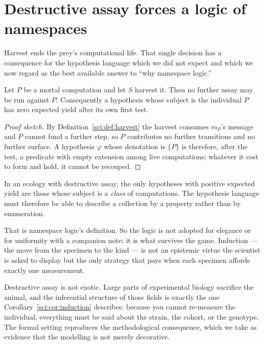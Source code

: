 \section{Destructive assay forces a logic of namespaces}\label{sci:S8}
\label{sci:sec:forced}

Harvest ends the prey's computational life. That single decision has a consequence for the hypothesis
language which we did not expect and which we now regard as the best available answer to ``why
namespace logic.''

\begin{proposition}
\label{sci:prop:onespecimen}
Let $P$ be a mortal computation and let $S$ harvest it. Then no further assay may be run against $P$.
Consequently a hypothesis whose subject is the individual $P$ has zero expected yield after its own
first test.
\end{proposition}

\begin{proof}[Proof sketch]
By Definition~\ref{sci:def:harvest} the harvest consumes $m_P$'s message and $P$ cannot fund a further
step, so $P$ contributes no further transitions and no further surface. A hypothesis $\varphi$ whose
denotation is $\{P\}$ is therefore, after the test, a predicate with empty extension among live
computations; whatever it cost to form and hold, it cannot be recouped.
\end{proof}

\begin{corollary}
\label{sci:cor:induction}
In an ecology with destructive assay, the only hypotheses with positive expected yield are those whose
subject is a \emph{class} of computations. The hypothesis language must therefore be able to describe
a collection by a property rather than by enumeration.
\end{corollary}

That is namespace logic's definition. So the logic is not adopted for elegance or for uniformity with
a companion note; it is what survives the game. Induction --- the move from the specimen to the kind
--- is not an epistemic virtue the scientist is asked to display but the only strategy that pays when
each specimen affords exactly one measurement.

\begin{remark}\label{sci:biological-reading}
Destructive assay is not exotic. Large parts of experimental biology sacrifice the animal, and the
inferential structure of those fields is exactly the one Corollary~\ref{sci:cor:induction} describes:
because you cannot re-measure the individual, everything must be said about the strain, the cohort, or
the genotype. The formal setting reproduces the methodological consequence, which we take as evidence
that the modelling is not merely decorative.
\end{remark}

